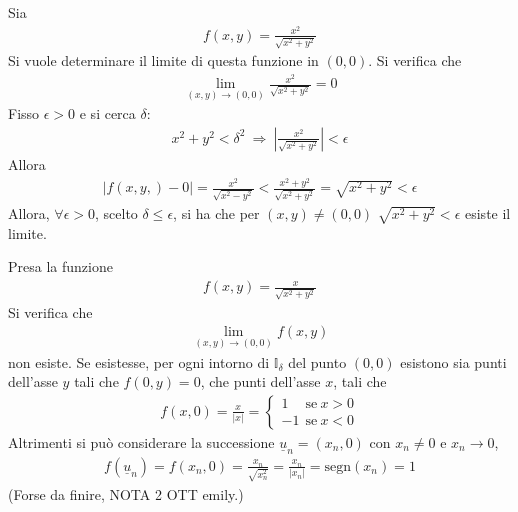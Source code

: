 \documentclass[a4paper, oneside]{book}
\begin{document}
\begin{example}
    Sia
    \begin{gather*}
        f(x, y) = \frac{x^{2}}{\sqrt{x^{2} + y^{2}} }
    \end{gather*}
    Si vuole determinare il limite di questa funzione in $(0, 0)$. Si 
    verifica che 
    \begin{gather*}
        \lim_{(x, y) \to (0, 0) } \frac{x^{2}}{\sqrt{x^{2} + y^{2}} } = 0
    \end{gather*}
    Fisso $\epsilon  >0$ e si cerca $\delta$:
    \begin{gather*}
        x^{2} + y^{2} < \delta ^{2} \ \Longrightarrow \ \left| \frac{x^{2}}{\sqrt{x^{2} + y^{2}} } \right|  < \epsilon
    \end{gather*}
    Allora 
    \begin{gather*}
        \left| f(x, y,) - 0\right|  = \frac{x^{2}}{\sqrt{x^{2} - y^{2}} } < \frac{x^{2} + y^{2}}{\sqrt{x^{2} + y^{2}} } = \sqrt{x^{2} + y^{2}}  < \epsilon
    \end{gather*}
    Allora, $\forall \epsilon > 0$, scelto $\delta \leq \epsilon$, si ha che 
    per $(x, y) \neq (0, 0)$ $\sqrt{x^{2} + y^{2}} < \epsilon$ esiste il limite. 
\end{example}

\begin{example}
    Presa la funzione 
    \begin{gather*}
        f(x, y) = \frac{x}{\sqrt{x^{2} + y^{2}} }
    \end{gather*}
    Si verifica che 
    \begin{gather*}
        \lim_{(x, y) \to (0, 0)} f(x, y) 
    \end{gather*}
    non esiste. Se esistesse, per ogni intorno di $\mathbb{I}_\delta$ del punto $(0, 0)$ esistono 
    sia punti dell'asse $y$ tali che $f(0, y) = 0$, che punti dell'asse $x$, tali che 
    \begin{gather*}
        f(x, 0) = \frac{x}{\left| x \right| } = \left\{\begin{array}{l}
            1 \quad \ \text{se} \ x > 0 \\
            -1 \ \ \text{se} \ x < 0
        \end{array}\right.
    \end{gather*}
    Altrimenti si può considerare la successione $\underline{u}_n = (x_n, 0)$ con $x_n \neq 0$ e $x_n \to 0$, 
    \begin{gather*}
        f(\underline{u}_n) = f(x_n, 0) = \frac{x_n}{\sqrt{x_n^{2}} } = \frac{x_n}{\left| x_n \right| } = \text{segn} (x_n) = 1
    \end{gather*}
    (Forse da finire, NOTA 2 OTT emily.)
\end{example}
\end{document}
